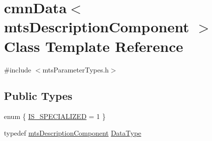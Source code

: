\hypertarget{classcmn_data_3_01mts_description_component_01_4}{\section{cmn\-Data$<$ mts\-Description\-Component $>$ Class Template Reference}
\label{classcmn_data_3_01mts_description_component_01_4}
}


{\ttfamily \#include $<$mts\-Parameter\-Types.\-h$>$}

\subsection*{Public Types}
\begin{DoxyCompactItemize}
\item 
enum \{ \hyperlink{classcmn_data_3_01mts_description_component_01_4_a5d03da76205e0d9dc3d32117ac2dcdbca534c6cc3ad48f4c52903e2e8a6bdd2dd}{I\-S\-\_\-\-S\-P\-E\-C\-I\-A\-L\-I\-Z\-E\-D} = 1
 \}
\item 
typedef \hyperlink{classmts_description_component}{mts\-Description\-Component} \hyperlink{classcmn_data_3_01mts_description_component_01_4_a5b51d26c4705dfe39a45243a2a4023dc}{Data\-Type}
\end{DoxyCompactItemize}
